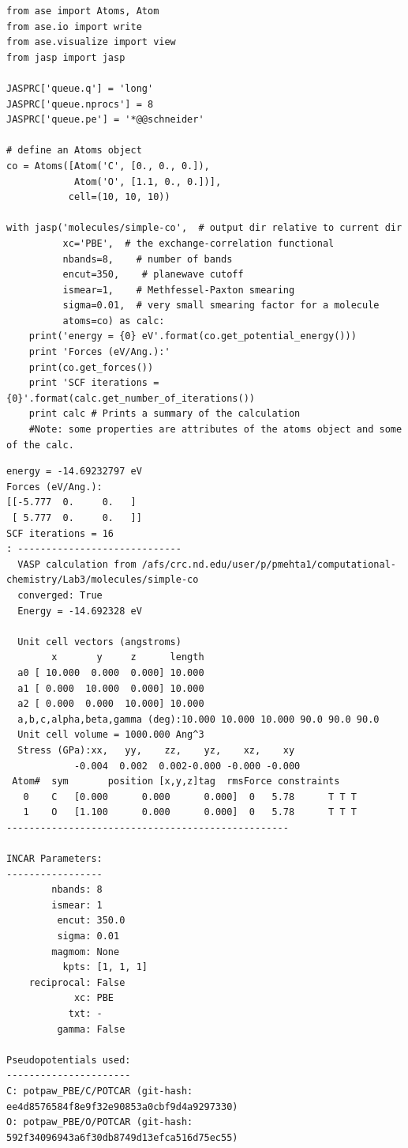 \documentclass[11pt]{article}
\begin{document}
\begin{verbatim}
from ase import Atoms, Atom
from ase.io import write
from ase.visualize import view
from jasp import jasp

JASPRC['queue.q'] = 'long'
JASPRC['queue.nprocs'] = 8
JASPRC['queue.pe'] = '*@@schneider'

# define an Atoms object
co = Atoms([Atom('C', [0., 0., 0.]),
            Atom('O', [1.1, 0., 0.])],
           cell=(10, 10, 10))

with jasp('molecules/simple-co',  # output dir relative to current dir
          xc='PBE',  # the exchange-correlation functional
          nbands=8,    # number of bands
          encut=350,    # planewave cutoff
          ismear=1,    # Methfessel-Paxton smearing
          sigma=0.01,  # very small smearing factor for a molecule
          atoms=co) as calc:
    print('energy = {0} eV'.format(co.get_potential_energy()))
    print 'Forces (eV/Ang.):'
    print(co.get_forces())
    print 'SCF iterations = {0}'.format(calc.get_number_of_iterations())
    print calc # Prints a summary of the calculation
    #Note: some properties are attributes of the atoms object and some of the calc.
\end{verbatim}

\begin{verbatim}
energy = -14.69232797 eV
Forces (eV/Ang.):
[[-5.777  0.     0.   ]
 [ 5.777  0.     0.   ]]
SCF iterations = 16
: -----------------------------
  VASP calculation from /afs/crc.nd.edu/user/p/pmehta1/computational-chemistry/Lab3/molecules/simple-co
  converged: True
  Energy = -14.692328 eV

  Unit cell vectors (angstroms)
        x       y     z      length
  a0 [ 10.000  0.000  0.000] 10.000
  a1 [ 0.000  10.000  0.000] 10.000
  a2 [ 0.000  0.000  10.000] 10.000
  a,b,c,alpha,beta,gamma (deg):10.000 10.000 10.000 90.0 90.0 90.0
  Unit cell volume = 1000.000 Ang^3
  Stress (GPa):xx,   yy,    zz,    yz,    xz,    xy
            -0.004  0.002  0.002-0.000 -0.000 -0.000
 Atom#  sym       position [x,y,z]tag  rmsForce constraints
   0    C   [0.000      0.000      0.000]  0   5.78      T T T
   1    O   [1.100      0.000      0.000]  0   5.78      T T T
--------------------------------------------------

INCAR Parameters:
-----------------
        nbands: 8
        ismear: 1
         encut: 350.0
         sigma: 0.01
        magmom: None
          kpts: [1, 1, 1]
    reciprocal: False
            xc: PBE
           txt: -
         gamma: False

Pseudopotentials used:
----------------------
C: potpaw_PBE/C/POTCAR (git-hash: ee4d8576584f8e9f32e90853a0cbf9d4a9297330)
O: potpaw_PBE/O/POTCAR (git-hash: 592f34096943a6f30db8749d13efca516d75ec55)
\end{verbatim}
\end{document}

